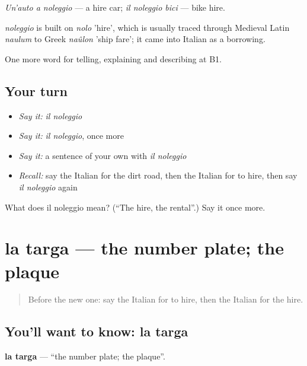 \emph{Un'auto a noleggio} — a hire car; \emph{il noleggio bici} — bike hire.

\begin{cousinweb}
\emph{noleggio} is built on \emph{nolo} 'hire', which is usually traced through Medieval Latin \emph{naulum} to Greek \emph{naûlon} 'ship fare'; it came into Italian as a borrowing.
\end{cousinweb}

\begin{grammarlens}[title={What you've built}]
One more word for telling, explaining and describing at B1.
\end{grammarlens}

\subsection*{Your turn}
\begin{itemize}
\raggedright
  \item \emph{Say it:} \emph{il noleggio}
  \item \emph{Say it:} \emph{il noleggio}, once more
  \item \emph{Say it:} a sentence of your own with \emph{il noleggio}
  \item \emph{Recall:} say the Italian for the dirt road, then the Italian for to hire, then say \emph{il noleggio} again
\end{itemize}

\begin{tcolorbox}[breakable,colback=teal!4,colframe=teal!35!black,title={Before you move on}]
What does il noleggio mean? (\textquotedblleft{}The hire, the rental\textquotedblright{}.) Say it once more.
\end{tcolorbox}
\section[la targa]{la targa — the number plate; the plaque}

\label{lesson:IT-C415-targa}



\begin{quote}
Before the new one: say the Italian for to hire, then the Italian for the hire.
\end{quote}

\subsection*{You'll want to know: la targa}
\textbf{la targa} — \textquotedblleft{}the number plate; the plaque\textquotedblright{}.


